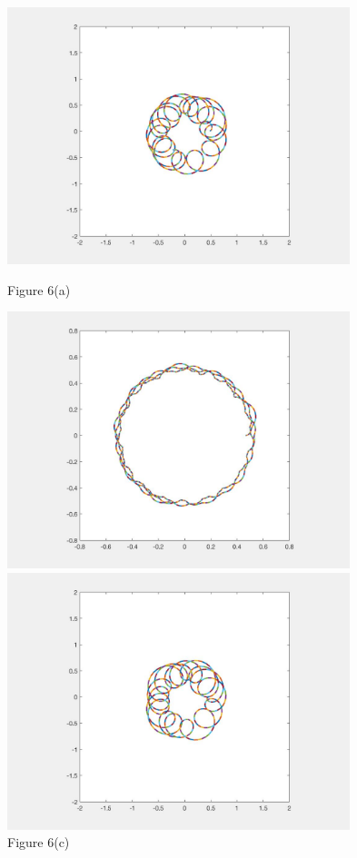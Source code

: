 \documentclass[12pt]{article}
\renewcommand{\(}{\left (}
\renewcommand{\)}{\right )}
\begin{document}
\begin{figure}[ht]
	\begin{minipage}{0.5\textwidth}
		\centering
		\includegraphics[width=0.89\textwidth]{uneven_firsthalf.jpg}
		\caption*{\small Figure 6(a)}
	\end{minipage}
	\begin{minipage}{0.5\textwidth}
		\centering
		\includegraphics[width=0.89\textwidth]{uneven_trisection_L150.jpg}
		\caption*{\small Figure 6(c)}
	\end{minipage}
	\begin{minipage}{0.5\textwidth}
		\centering
		\includegraphics[width=0.89\textwidth]{uneven_secondhalf.jpg}

\end{minipage}
\end{figure}
\end{document}
